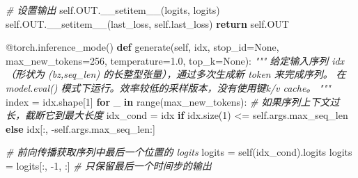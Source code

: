 \documentclass[
]{article}
\newenvironment{Shaded}{}{}
\newcommand{\AttributeTok}[1]{\textcolor[rgb]{0.49,0.56,0.16}{#1}}
\newcommand{\BuiltInTok}[1]{\textcolor[rgb]{0.00,0.50,0.00}{#1}}
\newcommand{\CommentTok}[1]{\textcolor[rgb]{0.38,0.63,0.69}{\textit{#1}}}
\newcommand{\ControlFlowTok}[1]{\textcolor[rgb]{0.00,0.44,0.13}{\textbf{#1}}}
\newcommand{\DecValTok}[1]{\textcolor[rgb]{0.25,0.63,0.44}{#1}}
\newcommand{\FloatTok}[1]{\textcolor[rgb]{0.25,0.63,0.44}{#1}}
\newcommand{\FunctionTok}[1]{\textcolor[rgb]{0.02,0.16,0.49}{#1}}
\newcommand{\KeywordTok}[1]{\textcolor[rgb]{0.00,0.44,0.13}{\textbf{#1}}}
\newcommand{\NormalTok}[1]{#1}
\newcommand{\OperatorTok}[1]{\textcolor[rgb]{0.40,0.40,0.40}{#1}}
\newcommand{\StringTok}[1]{\textcolor[rgb]{0.25,0.44,0.63}{#1}}
\newcommand{\VariableTok}[1]{\textcolor[rgb]{0.10,0.09,0.49}{#1}}
\begin{document}
\begin{Shaded}
\begin{Highlighting}[]
        \CommentTok{\# 设置输出}
        \VariableTok{self}\NormalTok{.OUT.}\FunctionTok{\_\_setitem\_\_}\NormalTok{(}\StringTok{\textquotesingle{}logits\textquotesingle{}}\NormalTok{, logits)}
        \VariableTok{self}\NormalTok{.OUT.}\FunctionTok{\_\_setitem\_\_}\NormalTok{(}\StringTok{\textquotesingle{}last\_loss\textquotesingle{}}\NormalTok{, }\VariableTok{self}\NormalTok{.last\_loss)}
        \ControlFlowTok{return} \VariableTok{self}\NormalTok{.OUT}

    
    \AttributeTok{@torch.inference\_mode}\NormalTok{()}
    \KeywordTok{def}\NormalTok{ generate(}\VariableTok{self}\NormalTok{, idx, stop\_id}\OperatorTok{=}\VariableTok{None}\NormalTok{, max\_new\_tokens}\OperatorTok{=}\DecValTok{256}\NormalTok{, temperature}\OperatorTok{=}\FloatTok{1.0}\NormalTok{, top\_k}\OperatorTok{=}\VariableTok{None}\NormalTok{):}
        \CommentTok{"""}
\CommentTok{        给定输入序列 idx（形状为 (bz,seq\_len) 的长整型张量），通过多次生成新 token 来完成序列。}
\CommentTok{        在 model.eval() 模式下运行。效率较低的采样版本，没有使用键k/v cache。}
\CommentTok{        """}
\NormalTok{        index }\OperatorTok{=}\NormalTok{ idx.shape[}\DecValTok{1}\NormalTok{]}
        \ControlFlowTok{for}\NormalTok{ \_ }\KeywordTok{in} \BuiltInTok{range}\NormalTok{(max\_new\_tokens):}
            \CommentTok{\# 如果序列上下文过长，截断它到最大长度}
\NormalTok{            idx\_cond }\OperatorTok{=}\NormalTok{ idx }\ControlFlowTok{if}\NormalTok{ idx.size(}\DecValTok{1}\NormalTok{) }\OperatorTok{\textless{}=} \VariableTok{self}\NormalTok{.args.max\_seq\_len }\ControlFlowTok{else}\NormalTok{ idx[:, }\OperatorTok{{-}}\VariableTok{self}\NormalTok{.args.max\_seq\_len:]}
            
            \CommentTok{\# 前向传播获取序列中最后一个位置的 logits}
\NormalTok{            logits }\OperatorTok{=} \VariableTok{self}\NormalTok{(idx\_cond).logits}
\NormalTok{            logits }\OperatorTok{=}\NormalTok{ logits[:, }\OperatorTok{{-}}\DecValTok{1}\NormalTok{, :] }\CommentTok{\# 只保留最后一个时间步的输出}
            

\end{Highlighting}
\end{Shaded}
\end{document}
